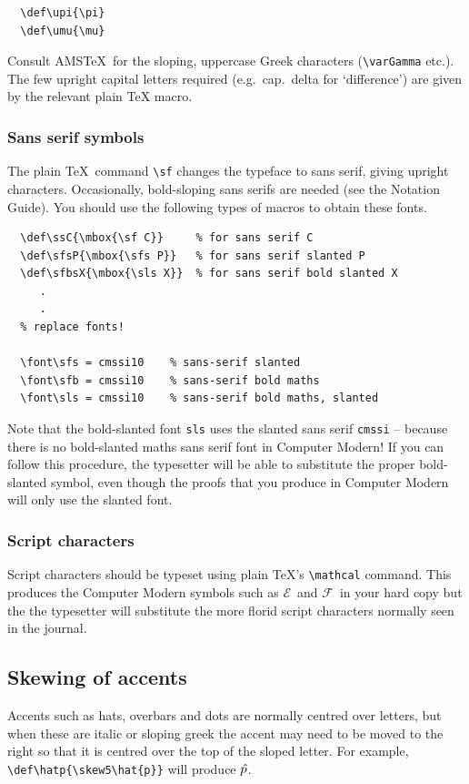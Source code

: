 \smallskip
\begin{verbatim}
  \def\upi{\pi}
  \def\umu{\mu}
\end{verbatim}
\smallskip

Consult AMS\TeX\ for the sloping, uppercase Greek characters
(\verb"\varGamma" etc.). The few upright capital letters required 
(e.g.\ cap.\ delta for `difference') are given by the relevant plain 
TeX macro.

\subsubsection{Sans serif symbols}
The plain \TeX\ command \verb"\sf" changes the typeface to sans serif,
giving upright characters. Occasionally, bold-sloping sans serifs are
needed (see the Notation Guide). You should use the following types of
macros to obtain these fonts.

\smallskip
\begin{verbatim}
  \def\ssC{\mbox{\sf C}}     % for sans serif C
  \def\sfsP{\mbox{\sfs P}}   % for sans serif slanted P
  \def\sfbsX{\mbox{\sls X}}  % for sans serif bold slanted X
     .
     .
  % replace fonts!

  \font\sfs = cmssi10    % sans-serif slanted
  \font\sfb = cmssi10    % sans-serif bold maths 
  \font\sls = cmssi10    % sans-serif bold maths, slanted 
\end{verbatim}
\smallskip

\noindent Note that the bold-slanted font \verb"sls" uses the slanted sans
serif \verb"cmssi" -- because there is no bold-slanted maths sans serif
font in Computer Modern! If you can follow this procedure, the
typesetter will be able to substitute the proper bold-slanted symbol,
even though the proofs that you produce in Computer Modern will only use
the slanted font.

\subsubsection{Script characters}
Script characters should be typeset using plain \TeX 's \verb"\mathcal"
command. This produces the Computer Modern symbols such as {$\mathcal E\,$}
and {$\mathcal F\,$} in your hard copy but the the typesetter will substitute
the more florid script characters normally seen in the journal.

\subsection{Skewing of accents}
Accents such as hats, overbars and dots are normally centred over letters,
but when these are italic or sloping greek the accent may need to be moved
to the right so that it is centred over the top of the sloped letter. For
example, \verb"\def\hatp{\skew5\hat{p}}" will produce $\hatp$.


